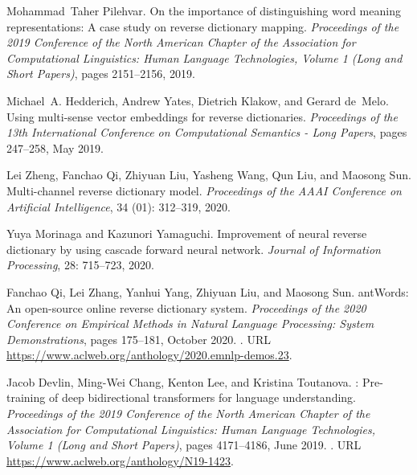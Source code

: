 \documentclass{article}
\begin{document}
\begin{thebibliography}{45}
Mohammad~Taher Pilehvar.
\newblock On the importance of distinguishing word meaning representations: A
  case study on reverse dictionary mapping.
\newblock \emph{Proceedings of the 2019 Conference of the North American
  Chapter of the Association for Computational Linguistics: Human Language
  Technologies, Volume 1 (Long and Short Papers)}, pages 2151--2156, 2019.

Michael~A. Hedderich, Andrew Yates, Dietrich Klakow, and Gerard de~Melo.
\newblock Using multi-sense vector embeddings for reverse dictionaries.
\newblock \emph{Proceedings of the 13th International Conference on
  Computational Semantics - Long Papers}, pages 247--258, May 2019.

Lei Zheng, Fanchao Qi, Zhiyuan Liu, Yasheng Wang, Qun Liu, and Maosong Sun.
\newblock Multi-channel reverse dictionary model.
\newblock \emph{Proceedings of the AAAI Conference on Artificial Intelligence},
  34 (01): 312--319, 2020.

Yuya Morinaga and Kazunori Yamaguchi.
\newblock Improvement of neural reverse dictionary by using cascade forward
  neural network.
\newblock \emph{Journal of Information Processing}, 28: 715--723,
  2020.

Fanchao Qi, Lei Zhang, Yanhui Yang, Zhiyuan Liu, and Maosong Sun.
ant{W}ords: An open-source online reverse dictionary system.
\newblock \emph{Proceedings of the 2020 Conference on Empirical Methods in
  Natural Language Processing: System Demonstrations}, pages 175--181, October
  2020.
\newblock {}.
\newblock URL \url{https://www.aclweb.org/anthology/2020.emnlp-demos.23}.

Jacob Devlin, Ming-Wei Chang, Kenton Lee, and Kristina Toutanova.
: Pre-training of deep bidirectional transformers for language
  understanding.
\newblock \emph{Proceedings of the 2019 Conference of the North {A}merican
  Chapter of the Association for Computational Linguistics: Human Language
  Technologies, Volume 1 (Long and Short Papers)}, pages 4171--4186, June 2019.
\newblock {}.
\newblock URL \url{https://www.aclweb.org/anthology/N19-1423}.


\end{thebibliography}
\end{document}
